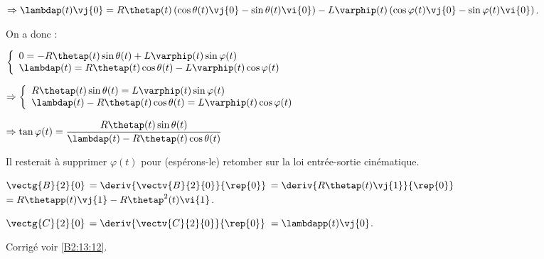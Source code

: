 $\Rightarrow \lambdap(t) \vj{0}= R\thetap(t) \left( \cos\theta(t)\vj{0}-\sin\theta(t)\vi{0} \right) - L\varphip(t)\left( \cos\varphi(t)\vj{0}-\sin\varphi(t)\vi{0}\right)$.

On a donc :

$
\left\{
\begin{array}{l}
0= -R\thetap(t) \sin\theta(t)  + L\varphip(t)\sin\varphi(t) \\
\lambdap(t) = R\thetap(t)  \cos\theta(t)- L\varphip(t)\cos\varphi(t)
\end{array}
\right.
$

$
\Rightarrow \left\{
\begin{array}{l}
R\thetap(t) \sin\theta(t)  = L\varphip(t)\sin\varphi(t) \\
\lambdap(t) - R\thetap(t)  \cos\theta(t)= L\varphip(t)\cos\varphi(t)
\end{array}
\right.
$

$\Rightarrow 
\tan \varphi(t) = \dfrac{R\thetap(t) \sin\theta(t) }{\lambdap(t) - R\thetap(t)  \cos\theta(t)}
$

Il resterait à supprimer $\varphi(t)$ pour (espérons-le) retomber sur la loi entrée-sortie cinématique.
\ifprof
\else
\fi



$\vectg{B}{2}{0}$
$=\deriv{\vectv{B}{2}{0}}{\rep{0}}$
$=\deriv{R\thetap(t) \vj{1}}{\rep{0}}$
$=R\thetapp(t) \vj{1} - R\thetap^2(t) \vi{1}$.
\ifprof
\else
\fi


$\vectg{C}{2}{0}$
$=\deriv{\vectv{C}{2}{0}}{\rep{0}}$
$=\lambdapp(t) \vj{0} $.
\ifprof
\else
\fi


\ifprof
\else
\begin{flushright}
\footnotesize{Corrigé  voir \ref{B2:13:12}.}
\end{flushright}%
\fi